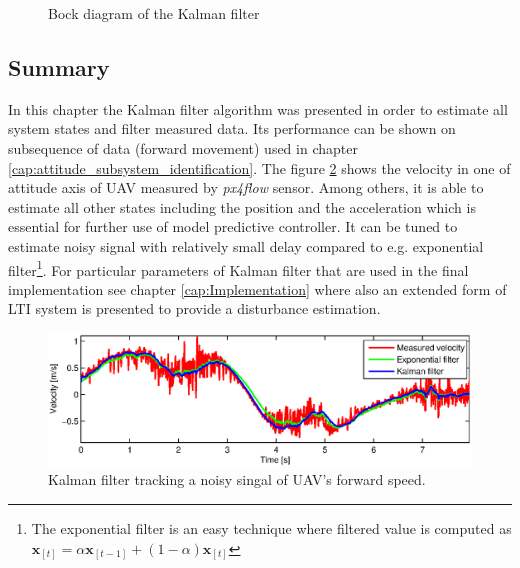 \begin{figure}
\caption{Bock diagram of the Kalman filter}
\label{fig:kalman_diagram}
\end{figure}

\subsection{Summary}

In this chapter the Kalman filter algorithm was presented in order to estimate all system states and filter measured data. Its performance can be shown on subsequence of data (forward movement) used in chapter \ref{cap:attitude_subsystem_identification}. The figure \ref{fig:kalman1} shows the velocity in one of attitude axis of UAV measured by \emph{px4flow} sensor. Among others, it is able to estimate all other states including the position and the acceleration which is essential for further use of model predictive controller. It can be tuned to estimate noisy signal with relatively small delay compared to e.g. exponential filter\footnote{The exponential filter is an easy technique where filtered value is computed as $\textbf{\^x}_{[t]} = \alpha\textbf{\^x}_{[t-1]} + (1-\alpha)\textbf{x}_{[t]}$}. For particular parameters of Kalman filter that are used in the final implementation see chapter \ref{cap:Implementation} where also an extended form of LTI system is presented to provide a disturbance estimation.

\begin{figure}[h]
\includegraphics[width=1\textwidth]{fig/kalman1.eps} 
\caption{Kalman filter tracking a noisy singal of UAV's forward speed.}
\label{fig:kalman1}
\end{figure}